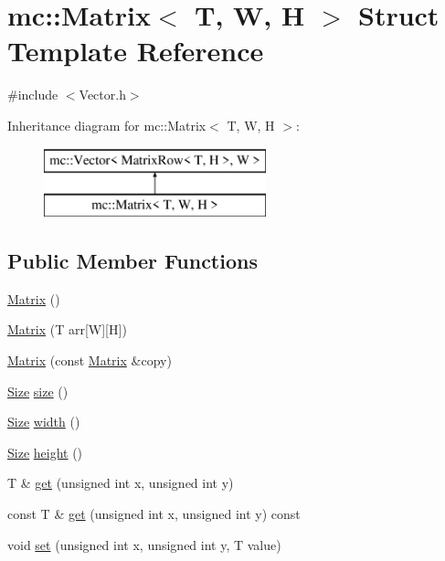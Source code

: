 \hypertarget{structmc_1_1_matrix}{}\section{mc\+:\+:Matrix$<$ T, W, H $>$ Struct Template Reference}
\label{structmc_1_1_matrix}


{\ttfamily \#include $<$Vector.\+h$>$}

Inheritance diagram for mc\+:\+:Matrix$<$ T, W, H $>$\+:\begin{figure}[H]
\begin{center}
\leavevmode
\includegraphics[height=2.000000cm]{dd/db1/structmc_1_1_matrix}
\end{center}
\end{figure}
\subsection*{Public Member Functions}
\begin{DoxyCompactItemize}
\item 
\hyperlink{structmc_1_1_matrix_a1c0107dd6bf262a240653fcc2650fb2b}{Matrix} ()
\item 
\hyperlink{structmc_1_1_matrix_a4bceda87f2c87294d4a631b2229dff8f}{Matrix} (T arr\mbox{[}W\mbox{]}\mbox{[}H\mbox{]})
\item 
\hyperlink{structmc_1_1_matrix_a16a62a958729f121805a76d43554bc69}{Matrix} (const \hyperlink{structmc_1_1_matrix}{Matrix} \&copy)
\item 
\hyperlink{namespacemc_ad1c06461067735b3b17e0df612532c4e}{Size} \hyperlink{structmc_1_1_matrix_ac7b493824ba976376aeac2de193f41f2}{size} ()
\item 
\hyperlink{namespacemc_ad1c06461067735b3b17e0df612532c4e}{Size} \hyperlink{structmc_1_1_matrix_af50d7f0d342318246a98fb7e01ae4989}{width} ()
\item 
\hyperlink{namespacemc_ad1c06461067735b3b17e0df612532c4e}{Size} \hyperlink{structmc_1_1_matrix_ad9eaa721ec2db5bb588ae12e6c2a78b3}{height} ()
\item 
T \& \hyperlink{structmc_1_1_matrix_ad4c47d5e7ef5c88264b06554a64f7ae7}{get} (unsigned int x, unsigned int y)
\item 
const T \& \hyperlink{structmc_1_1_matrix_aa8cca780babd0f83797e05400538ad69}{get} (unsigned int x, unsigned int y) const 
\item 
void \hyperlink{structmc_1_1_matrix_a7a4970e6c6d4c277cd7d15cffb3e470f}{set} (unsigned int x, unsigned int y, T value)
\end{DoxyCompactItemize}
